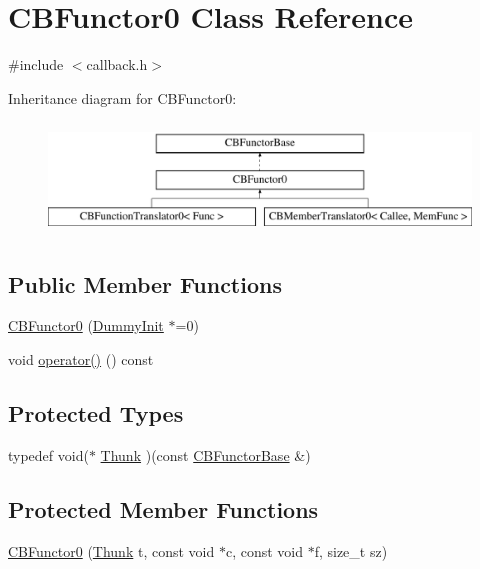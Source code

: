 \hypertarget{class_c_b_functor0}{\section{C\+B\+Functor0 Class Reference}
\label{class_c_b_functor0}
}


{\ttfamily \#include $<$callback.\+h$>$}

Inheritance diagram for C\+B\+Functor0\+:\begin{figure}[H]
\begin{center}
\leavevmode
\includegraphics[height=3.000000cm]{class_c_b_functor0}
\end{center}
\end{figure}
\subsection*{Public Member Functions}
\begin{DoxyCompactItemize}
\item 
\hyperlink{class_c_b_functor0_a1d4339ce09c414318ffc540687c3199c}{C\+B\+Functor0} (\hyperlink{class_c_b_functor_base_1_1_dummy_init}{Dummy\+Init} $\ast$=0)
\item 
void \hyperlink{class_c_b_functor0_a202aaeb45c6bfeaf12d2c41da3196a4c}{operator()} () const 
\end{DoxyCompactItemize}
\subsection*{Protected Types}
\begin{DoxyCompactItemize}
\item 
typedef void($\ast$ \hyperlink{class_c_b_functor0_a119383401b67ee5f38dc80ab6ff017cc}{Thunk} )(const \hyperlink{class_c_b_functor_base}{C\+B\+Functor\+Base} \&)
\end{DoxyCompactItemize}
\subsection*{Protected Member Functions}
\begin{DoxyCompactItemize}
\item 
\hyperlink{class_c_b_functor0_aed4d9ab6bdc4daefe1dec16fb1a64a76}{C\+B\+Functor0} (\hyperlink{class_c_b_functor0_a119383401b67ee5f38dc80ab6ff017cc}{Thunk} t, const void $\ast$c, const void $\ast$f, size\+\_\+t sz)
\end{DoxyCompactItemize}
